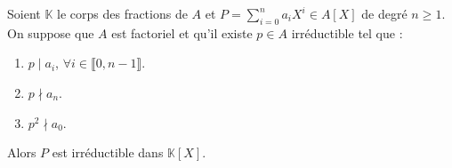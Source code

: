 	\begin{theorem}
		\label{critere-d-eisenstein-6}
		Soient $\mathbb{K}$ le corps des fractions de $A$ et $P = \sum_{i=0}^n a_i X^i \in A[X]$ de degré $n \geq 1$. On suppose que $A$ est factoriel et qu'il existe $p \in A$ irréductible tel que :
		\begin{enumerate}[label=(\roman*)]
			\item \label{critere-d-eisenstein-7} $p \mid a_i$, $\forall i \in \llbracket 0, n-1 \rrbracket$.
			\item \label{critere-d-eisenstein-8} $p \nmid a_n$.
			\item \label{critere-d-eisenstein-9} $p^2 \nmid a_0$.
		\end{enumerate}
		Alors $P$ est irréductible dans $\mathbb{K}[X]$.
	\end{theorem}

